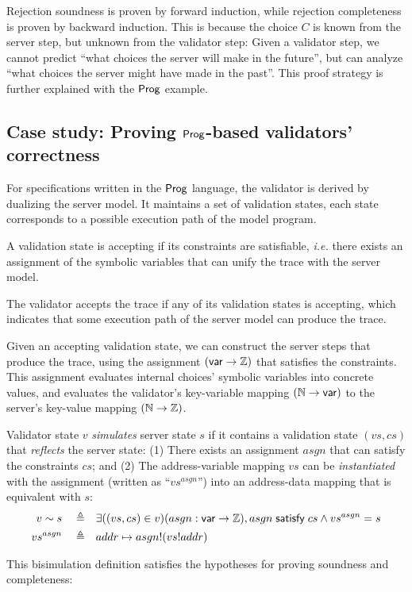 Rejection soundness is proven by forward induction, while rejection completeness
is proven by backward induction.  This is because the choice $C$ is known from
the server step, but unknown from the validator step: Given a validator step, we
cannot predict ``what choices the server will make in the future'', but can
analyze ``what choices the server might have made in the past''.  This proof
strategy is further explained with the $\mathsf{Prog}$ example.

\subsection{Case study: Proving $\mathsf{Prog}$-based validators' correctness}
For specifications written in the $\mathsf{Prog}$ language, the validator is derived by
dualizing the server model.  It maintains a set of validation states, each state
corresponds to a possible execution path of the model program.

A validation state is accepting if its constraints are satisfiable, {\it i.e.}
there exists an assignment of the symbolic variables that can unify the trace
with the server model.

The validator accepts the trace if any of its validation states is accepting,
which indicates that some execution path of the server model can produce the
trace.

Given an accepting validation state, we can construct the server steps that
produce the trace, using the assignment $(\mathsf{var}\to\mathbb Z)$ that satisfies the
constraints.  This assignment evaluates internal choices' symbolic variables
into concrete values, and evaluates the validator's key-variable mapping
$(\mathbb N\to\mathsf{var})$ to the server's key-value mapping $(\mathbb N\to\mathbb Z)$.

\begin{definition}
  Validator state $v$ {\em simulates} server state $s$ if it contains a
  validation state $(vs,cs)$ that {\em reflects} the server state: (1) There
  exists an assignment $asgn$ that can satisfy the constraints $cs$; and (2) The
  address-variable mapping $vs$ can be {\em instantiated} with the assignment
  (written as ``$vs^{asgn}$'') into an address-data mapping that is equivalent
  with $s$:
  \begin{align*}
    v\sim s\quad\triangleq\quad& \exists((vs,cs)\in v)(asgn:\mathsf{var}\to\mathbb Z),asgn\;\mathsf{satisfy}\;cs\wedge vs^{asgn}=s\\ vs^{asgn}\quad\triangleq\quad&addr\mapsto
    asgn!(vs!addr)
  \end{align*}
\end{definition}
This bisimulation definition satisfies the hypotheses for proving soundness and
completeness:

